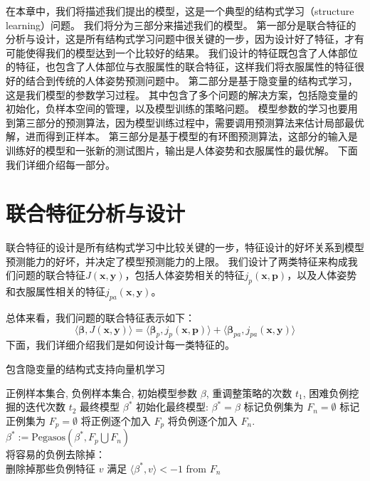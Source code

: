 在本章中，我们将描述我们提出的模型，这是一个典型的结构式学习（structure learning）问题。
我们将分为三部分来描述我们的模型。
第一部分是联合特征的分析与设计，这是所有结构式学习问题中很关键的一步，因为设计好了特征，才有可能使得我们的模型达到一个比较好的结果。
我们设计的特征既包含了人体部位的特征，也包含了人体部位与衣服属性的联合特征，这样我们将衣服属性的特征很好的结合到传统的人体姿势预测问题中。
第二部分是基于隐变量的结构式学习，这是我们模型的参数学习过程。
其中包含了多个问题的解决方案，包括隐变量的初始化，负样本空间的管理，以及模型训练的策略问题。
模型参数的学习也要用到第三部分的预测算法，因为模型训练过程中，需要调用预测算法来估计局部最优解，进而得到正样本。
第三部分是基于模型的有环图预测算法，这部分的输入是训练好的模型和一张新的测试图片，输出是人体姿势和衣服属性的最优解。
下面我们详细介绍每一部分。

\section{联合特征分析与设计}
联合特征的设计是所有结构式学习中比较关键的一步\cite{svm-struct}，特征设计的好坏关系到模型预测能力的好坏，并决定了模型预测能力的上限。
我们设计了两类特征来构成我们问题的联合特征$J(\mathbf{x}, \mathbf{y})$，包括人体姿势相关的特征$j_p(\mathbf{x}, \mathbf{p})$，以及人体姿势和衣服属性相关的特征$j_{pa}(\mathbf{x}, \mathbf{y})$。

总体来看，我们问题的联合特征表示如下：
\begin{equation}
    \label{eq:feature}
    \langle \mathbf{\beta}, J(\mathbf{x},\mathbf{y}) \rangle = \langle \mathbf{\beta}_p, j_p(\mathbf{x}, \mathbf{p}) \rangle + \langle \mathbf{\beta}_{pa}, j_{pa}(\mathbf{x},\mathbf{y}) \rangle
\end{equation}
下面，我们详细介绍我们是如何设计每一类特征的。




\begin{algorithm}
\caption{包含隐变量的结构式支持向量机学习}
\begin{algorithmic}[1]
    \REQUIRE 正例样本集合, 负例样本集合, 初始模型参数 $\beta$, 重调整策略的次数 $t_1$, 困难负例挖掘的迭代次数 $t_2$
    \ENSURE 最终模型 ${\beta}^*$
    \STATE 初始化最终模型: ${\beta}^* = \beta$
    \STATE 标记负例集为 $F_n = \emptyset$
        \STATE 标记正例集为 $F_p = \emptyset$
        \STATE 将正例逐个加入 $F_p$
            \STATE 将负例逐个加入 $F_n$.
            \STATE ${\beta}^* := \mathrm{Pegasos}({\beta}^*, F_p \bigcup F_n)$\\
            \STATE 将容易的负例去除掉： \\
             删除掉那些负例特征 $v$ 满足 $\langle{\beta}^*, v \rangle < -1$ from $F_n$
        \ENDFOR
    \ENDFOR
\end{algorithmic}
\label{alg:train}
\end{algorithm}


